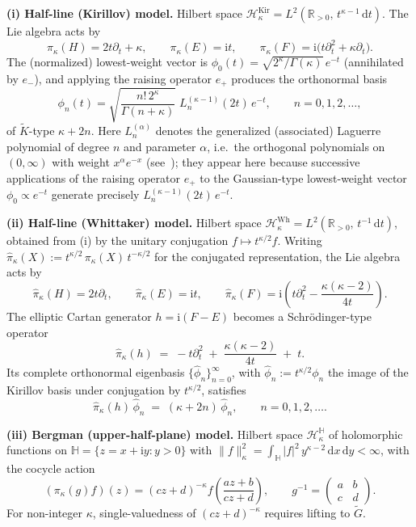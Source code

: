 \documentclass[11pt]{article}
\theoremstyle{plain}
\theoremstyle{definition}
\theoremstyle{remark}
\newcommand{\R}{\mathbb{R}}
\newcommand{\HH}{\mathbb{H}}
\newcommand{\Kt}{\widetilde{K}}
\newcommand{\Gt}{\widetilde{G}}
\newcommand{\Hil}{\mathcal{H}}
\newcommand{\ii}{\mathrm{i}}
\begin{document}
\medskip\noindent\textbf{(i) Half-line (Kirillov) model.}
Hilbert space $\Hil^{\mathrm{Kir}}_{\kappa}=L^{2}(\R_{>0},\,t^{\kappa-1}\,\mathrm{d}t)$. The Lie
algebra acts by
\[
  \pi_{\kappa}(H)=2t\partial_{t}+\kappa,\qquad
  \pi_{\kappa}(E)=\ii t,\qquad
  \pi_{\kappa}(F)=\ii\bigl(t\partial_{t}^{2}+\kappa\partial_{t}\bigr).
\]
The (normalized) lowest-weight vector is $\phi_{0}(t)=\sqrt{2^{\kappa}/\Gamma(\kappa)}\,e^{-t}$ (annihilated by $e_{-}$),
and applying the raising operator $e_{+}$ produces the orthonormal basis
\[
  \phi_{n}(t)=\sqrt{\frac{n!\,2^{\kappa}}{\Gamma(n+\kappa)}}\;L_{n}^{(\kappa-1)}(2t)\,e^{-t},\qquad n=0,1,2,\ldots,
\]
of $\Kt$-type $\kappa+2n$. Here $L_{n}^{(\alpha)}$ denotes the generalized
(associated) Laguerre polynomial of degree $n$ and parameter $\alpha$, i.e.\ the
orthogonal polynomials on $(0,\infty)$ with weight $x^{\alpha}e^{-x}$
(see~\cite[Ch.~18]{DLMF}); they appear here because successive applications of
the raising operator $e_{+}$ to the Gaussian-type lowest-weight vector
$\phi_{0}\propto e^{-t}$ generate precisely $L_{n}^{(\kappa-1)}(2t)\,e^{-t}$.

\medskip\noindent\textbf{(ii) Half-line (Whittaker) model.}
Hilbert space $\Hil^{\mathrm{Wh}}_{\kappa}=L^{2}(\R_{>0},\,t^{-1}\,\mathrm{d}t)$, obtained
from (i) by the unitary conjugation $f\mapsto t^{\kappa/2}f$. Writing
$\hat\pi_{\kappa}(X):=t^{\kappa/2}\,\pi_{\kappa}(X)\,t^{-\kappa/2}$ for the
conjugated representation, the Lie algebra acts by
\[
  \hat\pi_{\kappa}(H)=2t\partial_{t},\qquad
  \hat\pi_{\kappa}(E)=\ii t,\qquad
  \hat\pi_{\kappa}(F)=\ii\!\left(t\partial_{t}^{2}-\frac{\kappa(\kappa-2)}{4t}\right).
\]
The elliptic Cartan
generator $h=\ii(F-E)$ becomes a Schr\"odinger-type operator
\begin{equation}\label{eq:hatpih-Schrodinger}
  \hat\pi_{\kappa}(h)\;=\;-t\partial_{t}^{2}\;+\;\frac{\kappa(\kappa-2)}{4t}\;+\;t.
\end{equation}
Its complete orthonormal eigenbasis $\{\hat\phi_{n}\}_{n=0}^{\infty}$, with $\hat\phi_{n}:=t^{\kappa/2}\phi_{n}$ the image of the Kirillov basis under conjugation by $t^{\kappa/2}$, satisfies
\begin{equation}\label{eq:hatphin-eigen}
  \hat\pi_{\kappa}(h)\,\hat\phi_{n}\;=\;(\kappa+2n)\,\hat\phi_{n},\qquad n=0,1,2,\ldots.
\end{equation}

\medskip\noindent\textbf{(iii) Bergman (upper-half-plane) model.}
Hilbert space $\Hil^{\HH}_{\kappa}$ of holomorphic functions on $\HH=\{z=x+\ii y:y>0\}$
with $\|f\|^{2}_{\kappa}=\int_{\HH}|f|^{2}\,y^{\kappa-2}\,\mathrm{d}x\,\mathrm{d}y<\infty$, with
the cocycle action
\[
  (\pi_{\kappa}(g)f)(z)=(cz+d)^{-\kappa}f\!\left(\frac{az+b}{cz+d}\right),\qquad
  g^{-1}=\begin{pmatrix}a&b\\c&d\end{pmatrix}.
\]
For non-integer $\kappa$, single-valuedness of $(cz+d)^{-\kappa}$ requires lifting
to $\Gt$.
\end{document}
